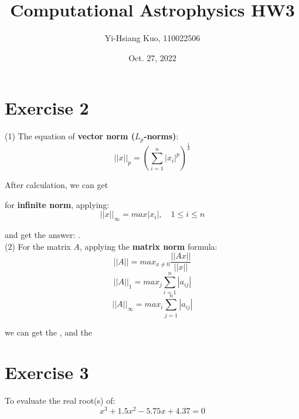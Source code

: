 \documentclass[aps,12pt,prd,nofootinbib,bibnotes, amsmath,amssymb,showpacs,superscriptaddress,floatfix]{revtex4-2}
\begin{document}
\title{Computational Astrophysics HW3}
\author{Yi-Hsiang Kuo, 110022506}
\date{Oct. 27, 2022}
\maketitle
\section{Exercise 2}
(1) The equation of {\bf{vector norm ($L_p$-norms)}}:
\begin{equation}
||x||_p = (\sum^n_{i = 1}|x_i|^p)^\frac{1}{p} 
\end{equation}

After calculation, we can get {\color{blue}{first and second norms $3.3$ and $2.7$ respectively}}

for {\bf{infinite norm}}, applying:
\begin{equation}
||x||_{\infty} = max|x_i|, \quad 1 \leq i \leq n
\end{equation}

and get the answer: {\color{blue}{2.6}}. \\
 
(2) For the matrix $A$, applying the {\bf{matrix norm}} formula:
\begin{equation}
||A|| = max_{x \neq 0} \frac{||Ax||}{||x||}
\end{equation}
\begin{equation}
||A||_1 = max_j \sum_{i=1}^n |a_{ij}|
\end{equation}
\begin{equation}
||A||_{\infty} = max_i \sum_{j=1}^n |a_{ij}|
\end{equation}

we can get the {\color{blue}{L1-norm (maximum absolute column sum):78}}, and the {} \\

\section{Exercise 3}
To evaluate the real root(s) of:
\begin{equation}
x^3+1.5 x^2 -5.75 x +4.37 = 0
\end{equation}
\end{document}
